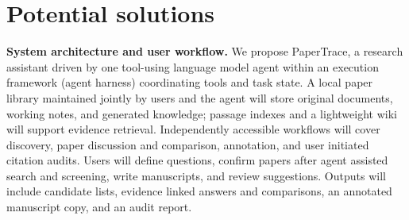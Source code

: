 \documentclass{article}
\begin{document}
\section{Potential solutions}

\noindent\textbf{System architecture and user workflow.} We propose PaperTrace, a research assistant driven by one tool-using language model agent within an execution framework (agent harness) coordinating tools and task state. A local paper library maintained jointly by users and the agent will store original documents, working notes, and generated knowledge; passage indexes and a lightweight wiki will support evidence retrieval. Independently accessible workflows will cover discovery, paper discussion and comparison, annotation, and user initiated citation audits. Users will define questions, confirm papers after agent assisted search and screening, write manuscripts, and review suggestions. Outputs will include candidate lists, evidence linked answers and comparisons, an annotated manuscript copy, and an audit report.
\end{document}

